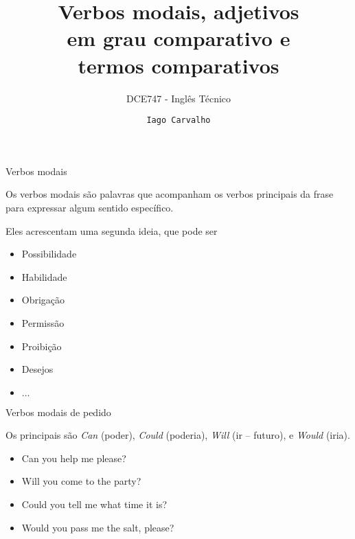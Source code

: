 \documentclass[compress,mathserif]{beamer}
\title{Verbos modais, adjetivos \\ em grau comparativo e \\ termos comparativos}
\subtitle{DCE747 - Inglês Técnico}
\author{\texttt{Iago Carvalho}}
\institute{\texttt{Departamento de Ciência da Computação}}
\begin{document}
\begin{frame}
\titlepage

\end{frame}


\begin{frame}{Verbos modais}

Os verbos modais são palavras que acompanham os verbos principais da frase para expressar algum sentido específico.

\vspace{0.5cm}

Eles acrescentam uma segunda ideia, que pode ser 
\begin{itemize}
    \item Possibilidade
    \item Habilidade
    \item Obrigação
    \item Permissão
    \item Proibição
    \item Desejos
    \item $\ldots$
\end{itemize} 

\end{frame}


\begin{frame}{Verbos modais de pedido}

Os principais são \textit{Can} (poder), \textit{Could} (poderia), \textit{Will} (ir – futuro), e \textit{Would} (iria).

\vspace{0.5cm}

\begin{itemize}
    \item Can you help me please?
    \item Will you come to the party?
    \item Could you tell me what time it is?
    \item Would you pass me the salt, please?
\end{itemize}

\end{frame}

\end{document}
